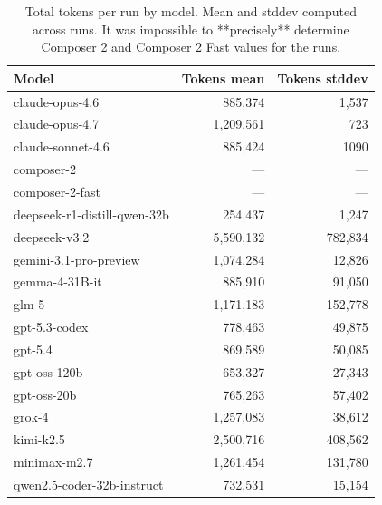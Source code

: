 \begin{table}[htbp]
\centering
\begin{tabular}{lrr}
\toprule
Model & Tokens mean & Tokens stddev \\
\midrule
claude-opus-4.6 & 885,374 & 1,537 \\
claude-opus-4.7 & 1,209,561 & 723 \\
claude-sonnet-4.6 & 885,424 & 1090 \\
composer-2 & --- & --- \\
composer-2-fast & --- & --- \\
deepseek-r1-distill-qwen-32b & 254,437 & 1,247 \\
deepseek-v3.2 & 5,590,132 & 782,834 \\
gemini-3.1-pro-preview & 1,074,284 & 12,826 \\
gemma-4-31B-it & 885,910 & 91,050 \\
glm-5 & 1,171,183 & 152,778 \\
gpt-5.3-codex & 778,463 & 49,875 \\
gpt-5.4 & 869,589 & 50,085 \\
gpt-oss-120b & 653,327 & 27,343 \\
gpt-oss-20b & 765,263 & 57,402 \\
grok-4 & 1,257,083 & 38,612 \\
kimi-k2.5 & 2,500,716 & 408,562 \\
minimax-m2.7 & 1,261,454 & 131,780 \\
qwen2.5-coder-32b-instruct & 732,531 & 15,154 \\
\bottomrule
\end{tabular}
\caption{Total tokens per run by model. Mean and stddev computed across runs. It was impossible to **precisely** determine Composer 2 and Composer 2 Fast values for the runs.}
\label{tab:tokens-by-model}
\end{table}
